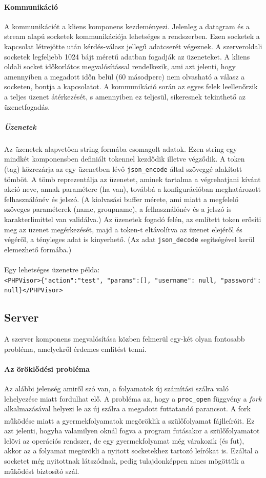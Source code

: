\documentclass[12pt]{report}
\begin{document}
\paragraph{Kommunikáció}
A kommunikációt a kliens komponens kezdeményezi. Jelenleg a datagram és a stream alapú socketek kommunikációja lehetséges a rendszerben. Ezen socketek a kapcsolat létrejötte után kérdés-válasz jellegű adatcserét végeznek. A szerveroldali socketek legfeljebb 1024 bájt méretű adatban fogadják az üzeneteket. A kliens oldali socket időkorlátos megvalósítással rendelkezik, ami azt jelenti, hogy amennyiben a megadott időn belül (60 másodperc) nem olvasható a válasz a socketen, bontja a kapcsolatot.
A kommunikáció során az egyes felek leellenőrzik a teljes üzenet átérkezését, s amennyiben ez teljesül, sikeresnek tekinthető az üzenetfogadás.
\subparagraph{Üzenetek}
Az üzenetek alapvetően string formába csomagolt adatok. Ezen string egy mindkét komponensben definiált tokennel kezdődik illetve végződik. A token (tag) közrezárja az egy üzenetben lévő \verb|json_encode| által szöveggé alakított tömböt. A tömb reprezentálja az üzenetet, aminek tartalma a végrehatjani kívánt akció neve, annak paramétere (ha van), továbbá a konfigurációban meghatározott felhasználónév és jelszó.
(A kiolvasási buffer mérete, ami miatt a megfelelő szöveges paraméterek (name, groupname), a felhasználónév és a jelszó is karakterlimittel van validálva.)
Az üzenetek fogadó felén, az említett token erősíti meg az üzenet megérkezését, majd a token-t eltávolítva az üzenet elejéről és végéről, a tényleges adat is kinyerhető. (Az adat \verb|json_decode| segítségével kerül elemezhető formába.) \\ \\


Egy lehetséges üzenetre példa: \\ \footnotesize
\verb|<PHPVisor>{"action":"test", "params":[], "username": null, "password": null}</PHPVisor>|
\normalsize
\subsection{Server}
A szerver komponens megvalósítása közben felmerül egy-két olyan fontosabb probléma, amelyekről érdemes említést tenni.
   \paragraph{Az öröklődési probléma}
   Az alábbi jelenség amiről szó van, a folyamatok új számítási szálra való lehelyezése miatt fordulhat elő. A probléma az, hogy a \verb|proc_open| függvény a \textit{fork} alkalmazásával helyezi le az új szálra a megadott futtatandó parancsot. A fork működése miatt \textsuperscript{\cite{fork}} a gyermekfolyamatok megöröklik a szülőfolyamat fájlleíróit. Ez azt jelenti, hogyha valamilyen oknál fogva a program futásakor a szülőfolyamatot lelövi az operációs rendszer, de egy gyermekfolyamat még várakozik (és fut), akkor az a folyamat megörökli a nyitott socketekhez tartozó leírókat is. Ezáltal a socketet még nyitottnak látszódnak, pedig tulajdonképpen nincs mögöttük a működést biztosító szál.
   
\end{document}
